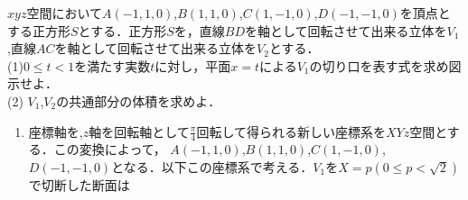 \documentclass[a4j]{jarticle}
\title{}
\begin{document}
\maketitle

\begin{oframed}
 $xyz$空間において$A(-1,1,0)$,$B(1,1,0)$,$C(1,-1,0)$,$D(-1,-1,0)$を頂点とする正方形$S$とする．正方形$S$を，直線$BD$を軸として回転させて出来る立体を$V_1$,直線$AC$を軸として回転させて出来る立体を$V_2$とする．\\
 (1)$0\le t<1$を満たす実数$t$に対し，平面$x=t$による$V_1$の切り口を表す式を求め図示せよ．\\
 (2) $V_1$,$V_2$の共通部分の体積を求めよ．
\end{oframed}

\setlength{\columnseprule}{0.4pt}
\begin{multicols}{2}
     \begin{enumerate}[(1)]
     \item 座標軸を,$z$軸を回転軸として$\frac{\pi}{4}$回転して得られる新しい座標系を$XYz$空間とする．この変換によって， 
     $A(-1,1,0)$,$B(1,1,0)$,$C(1,-1,0)$,$D(-1,-1,0)$となる．以下この座標系で考える．$V_1$を$X=p(0\le p<\sqrt2)$で切断した断面は
     
     \end{enumerate}

\end{multicols}
\end{document}
